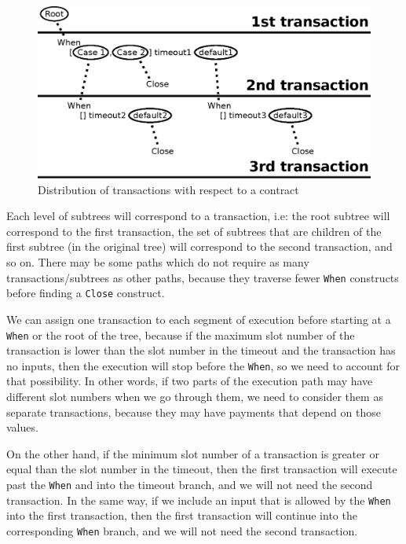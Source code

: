 \documentclass[english,runningheads]{llncs}
\begin{document}
\begin{figure}
\includegraphics[width=1\textwidth]{figures/transactions}

\caption{Distribution of transactions with respect to a contract\label{fig:Distribution-of-transactions}}

\end{figure}

Each level of subtrees will correspond to a transaction, i.e: the
root subtree will correspond to the first transaction, the set of
subtrees that are children of the first subtree (in the original tree)
will correspond to the second transaction, and so on. There may be
some paths which do not require as many transactions/subtrees as other
paths, because they traverse fewer \texttt{When} constructs before
finding a \texttt{Close} construct.

We can assign one transaction to each segment of execution
before starting at a \texttt{When} or the root of the tree,
because if the maximum slot number of the
transaction is lower than the slot number in the timeout and the
transaction has no inputs, then the execution will stop before the
\texttt{When}, so we need to account for that possibility. In other
words, if two parts of the execution path may have different slot
numbers when we go through them, we need to consider them as separate
transactions, because they may have payments that depend on those values.

On the other hand, if the minimum slot number of a transaction is greater
or equal than the slot number in the timeout, then the first transaction
will execute past the \texttt{When} and into the timeout branch, and
we will not need the second transaction. In the same way, if we include
an input that is allowed by the \texttt{When} into the first transaction,
then the first transaction will continue into the corresponding \texttt{When}
branch, and we will not need the second transaction.
\end{document}
